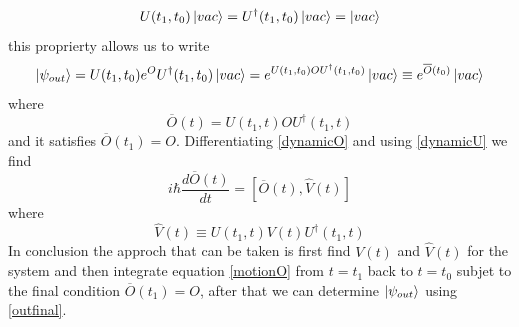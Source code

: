 \documentclass[12pt]{book}
\begin{document}
\begin{equation}U(t_1,t_0)\ket{vac}= U^\dagger(t_1,t_0)\ket{vac}= \ket{vac}\end{equation}
this proprierty allows us to write
\begin{equation}\ket{\psi_{out}} = U(t_1,t_0)e^OU^\dagger(t_1,t_0)\ket{vac} = e^{U(t_1,t_0)OU^\dagger(t_1,t_0) }\ket{vac}\equiv e^{\overline{O}(t_0)}\ket{vac}\end{equation}
where 
\begin{equation}\label{dynamicO}\overline{O}(t) = U(t_1,t)OU^\dagger(t_1,t)\end{equation}
and it satisfies $\overline{O}(t_1) = O$. Differentiating \eqref{dynamicO} and using \eqref{dynamicU} we find
\begin{equation}\label{motionO}i\hbar \frac{d\overline{O}(t)}{dt} = [\overline{O}(t),\hat{V}(t)]\end{equation}
where
\begin{equation}\hat{V}(t) \equiv U(t_1,t)V(t)U^\dagger(t_1,t)\end{equation}
In conclusion the approch that can be taken is first find $V(t)$ and $\hat{V}(t)$ for the system and then integrate equation \eqref{motionO} from $t=t_1$ back to $t=t_0$ subjet to the final condition $\overline{O}(t_1) = O$, after that we can determine $\ket{\psi_{out}}$ using \eqref{outfinal}.





\end{document}
